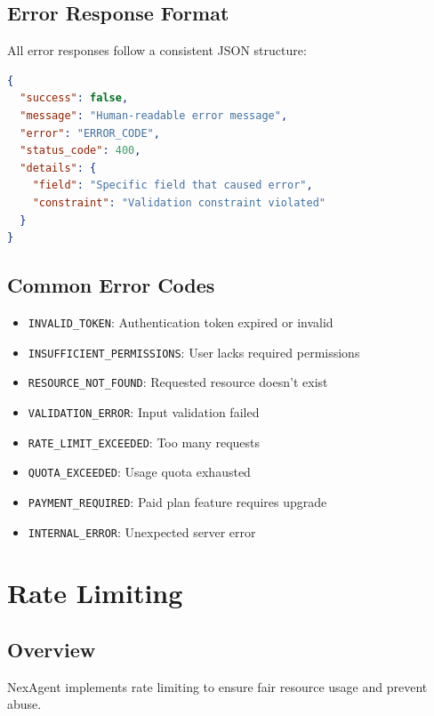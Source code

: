 \documentclass[11pt,a4paper]{report}
\begin{document}
\section{Error Response Format}

All error responses follow a consistent JSON structure:

\begin{lstlisting}[style=jsoncode,language=json]
{
  "success": false,
  "message": "Human-readable error message",
  "error": "ERROR_CODE",
  "status_code": 400,
  "details": {
    "field": "Specific field that caused error",
    "constraint": "Validation constraint violated"
  }
}
\end{lstlisting}

\section{Common Error Codes}

\begin{itemize}[leftmargin=*]
    \item \texttt{INVALID\_TOKEN}: Authentication token expired or invalid
    \item \texttt{INSUFFICIENT\_PERMISSIONS}: User lacks required permissions
    \item \texttt{RESOURCE\_NOT\_FOUND}: Requested resource doesn't exist
    \item \texttt{VALIDATION\_ERROR}: Input validation failed
    \item \texttt{RATE\_LIMIT\_EXCEEDED}: Too many requests
    \item \texttt{QUOTA\_EXCEEDED}: Usage quota exhausted
    \item \texttt{PAYMENT\_REQUIRED}: Paid plan feature requires upgrade
    \item \texttt{INTERNAL\_ERROR}: Unexpected server error
\end{itemize}

\newpage

\chapter{Rate Limiting}

\section{Overview}

NexAgent implements rate limiting to ensure fair resource usage and prevent abuse.
\end{document}
